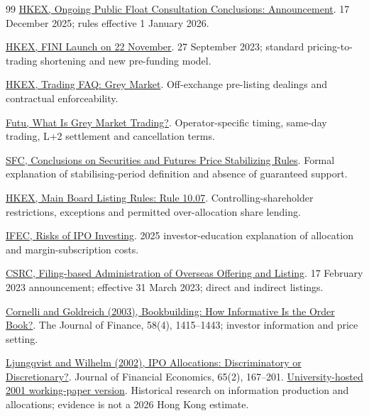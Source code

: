 \documentclass[11pt,a4paper]{article}
\begin{document}
\begin{thebibliography}{99}
 \href{https://www.hkex.com.hk/News/Regulatory-Announcements/2025/251217news?sc_lang=en}{HKEX, Ongoing Public Float Consultation Conclusions: Announcement}. 17 December 2025; rules effective 1 January 2026.

 \href{https://www.hkex.com.hk/News/News-Release/2023/230927news?sc_lang=en}{HKEX, FINI Launch on 22 November}. 27 September 2023; standard pricing-to-trading shortening and new pre-funding model.

 \href{https://www.hkex.com.hk/Global/Exchange/FAQ/Securities-Market/Trading?sc_lang=en}{HKEX, Trading FAQ: Grey Market}. Off-exchange pre-listing dealings and contractual enforceability.

 \href{https://www.futuhk.com/en/support/topic2_303}{Futu, What Is Grey Market Trading?}. Operator-specific timing, same-day trading, L+2 settlement and cancellation terms.

 \href{https://apps.sfc.hk/edistributionWeb/api/news/list-content?lang=EN&refNo=02PR130}{SFC, Conclusions on Securities and Futures Price Stabilizing Rules}. Formal explanation of stabilising-period definition and absence of guaranteed support.

 \href{https://en-rules.hkex.com.hk/entiresection/1}{HKEX, Main Board Listing Rules: Rule 10.07}. Controlling-shareholder restrictions, exceptions and permitted over-allocation share lending.

 \href{https://www.ifec.org.hk/web/en/investment/investment-products/stock/stock-trading/risks.page?componentID=1555380997193&submit=true}{IFEC, Risks of IPO Investing}. 2025 investor-education explanation of allocation and margin-subscription costs.

 \href{https://www.csrc.gov.cn/csrc_en/c102030/c7125865/content.shtml}{CSRC, Filing-based Administration of Overseas Offering and Listing}. 17 February 2023 announcement; effective 31 March 2023; direct and indirect listings.

 \href{https://onlinelibrary.wiley.com/doi/abs/10.1111/1540-6261.00572}{Cornelli and Goldreich (2003), Bookbuilding: How Informative Is the Order Book?}. The Journal of Finance, 58(4), 1415--1443; investor information and price setting.

 \href{https://www.sciencedirect.com/science/article/pii/S0304405X02001381}{Ljungqvist and Wilhelm (2002), IPO Allocations: Discriminatory or Discretionary?}. Journal of Financial Economics, 65(2), 167--201. \href{https://users.ox.ac.uk/~ofrcinfo/file_links/finecon_papers/2001fe08.pdf}{University-hosted 2001 working-paper version}. Historical research on information production and allocations; evidence is not a 2026 Hong Kong estimate.


\end{thebibliography}
\end{document}
